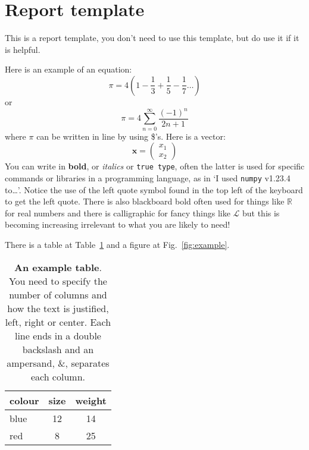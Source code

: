 \documentclass[12pt]{article}
\begin{document}
\section*{Report template}

This is a report template, you don't need to use this template, but do
use it if it is helpful.

Here is an example of an equation:
\begin{equation}
  \pi=4\left(1-\frac{1}{3}+\frac{1}{5}-\frac{1}{7}\ldots\right)
\end{equation}
or
\begin{equation}
  \pi=4\sum_{n=0}^\infty\frac{(-1)^{n}}{2n+1}
\end{equation}
where $\pi$ can be written in line by using \$'s. Here is a vector:
\begin{equation}
\mathbf{x}=\left(\begin{array}{c}x_1\\x_2\end{array}\right)
\end{equation}
You can write in \textbf{bold}, or \textsl{italics} or \texttt{true
  type}, often the latter is used for specific commands or libraries in a
programming language, as in `I used \texttt{numpy} v1.23.4 to\ldots'. Notice the use of the left quote symbol found in the top left of the keyboard to get the left quote. There is also blackboard bold often used for things like $\mathbb{R}$ for real numbers and there is calligraphic for fancy things like $\mathcal{L}$ but this is becoming increasing irrelevant to what you are likely to need! 

There is a table at Table~\ref{tab:example} and a figure at Fig.~\ref{fig:example}.

\begin{table}
\begin{center}
\begin{tabular}{l|cc}
colour&size&weight\\
\hline
blue&12&14\\
red&8&25
\end{tabular}
\end{center} 
\caption{\textbf{An example table}. You need to specify the number of columns and how the text is justified, left, right or center. Each line ends in a double backslash and an ampersand, \&, separates each column.}
\label{tab:example}
\end{table} 
\end{document}
